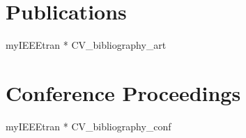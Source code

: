 \section{\sc Publications}
%
\vspace{0.8\baselineskip}
{myIEEEtran}
\nocite{CV_bibliography_art}{*}
{\def\section*#1{}{{CV_bibliography_art}{}}}


\section{\sc Conference Proceedings}
%
\vspace{0.8\baselineskip}
{myIEEEtran}
\nocite{CV_bibliography_conf}{*}
{\def\section*#1{}{{CV_bibliography_conf}{}}}





